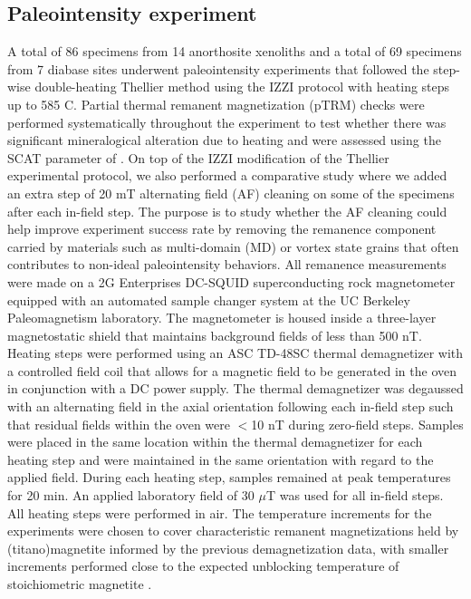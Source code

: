 \documentclass[9pt,twocolumn,twoside,lineno]{pnas-new}
\begin{document}
{\subsection*{Paleointensity experiment}
A total of 86 specimens from 14 anorthosite xenoliths and a total of 69 specimens from 7 diabase sites underwent paleointensity experiments that followed the step-wise double-heating Thellier method \cite{Thellier1959a} using the IZZI protocol \cite{Tauxe2004a} with heating steps up to 585 \textdegree C. Partial thermal remanent magnetization (pTRM) checks were performed systematically throughout the experiment to test whether there was significant mineralogical alteration due to heating and were assessed using the SCAT parameter of . On top of the IZZI modification of the Thellier experimental protocol, we also performed a comparative study where we added an extra step of 20 mT alternating field (AF) cleaning on some of the specimens after each in-field step. The purpose is to study whether the AF cleaning could help improve experiment success rate by removing the remanence component carried by materials such as multi-domain (MD) or vortex state grains that often contributes to non-ideal paleointensity behaviors. All remanence measurements were made on a 2G Enterprises DC-SQUID superconducting rock magnetometer equipped with an automated sample changer system at the UC Berkeley Paleomagnetism laboratory. The magnetometer is housed inside a three-layer magnetostatic shield that maintains background fields of less than 500 nT. Heating steps were performed using an ASC TD-48SC thermal demagnetizer with a controlled field coil that allows for a magnetic field to be generated in the oven in conjunction with a DC power supply. The thermal demagnetizer was degaussed with an alternating field in the axial orientation following each in-field step such that residual fields within the oven were $<$10 nT during zero-field steps. Samples were placed in the same location within the thermal demagnetizer for each heating step and were maintained in the same orientation with regard to the applied field. During each heating step, samples remained at peak temperatures for 20 min. An applied laboratory field of 30 $\mu$T was used for all in-field steps. All heating steps were performed in air. The temperature increments for the experiments were chosen to cover characteristic remanent magnetizations held by (titano)magnetite informed by the previous demagnetization data, with smaller increments performed close to the expected unblocking temperature of stoichiometric magnetite \cite{Zhang2021b}. 

}
\end{document}
